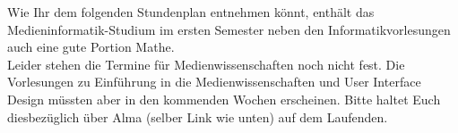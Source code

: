 
Wie Ihr dem folgenden Stundenplan entnehmen könnt, enthält das Medieninformatik-Studium im ersten
Semester neben den Informatikvorlesungen auch eine gute Portion Mathe.\\ %
Leider stehen die Termine für Medienwissenschaften noch nicht fest. Die Vorlesungen zu Einführung in die Medienwissenschaften und User Interface Design müssten aber in den kommenden Wochen erscheinen. Bitte haltet Euch diesbezüglich über Alma (selber Link wie unten) auf dem Laufenden.\\

